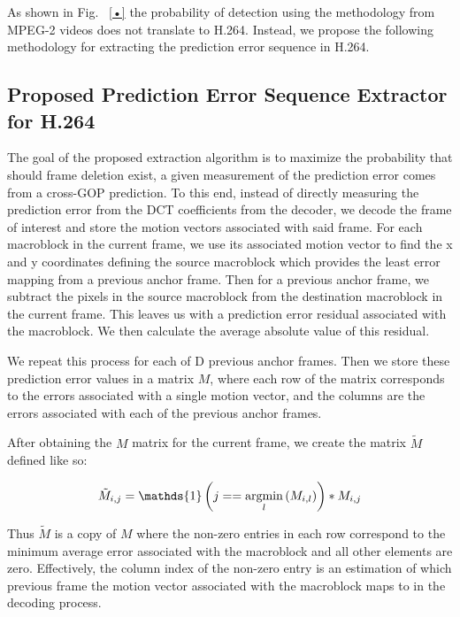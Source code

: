 
As shown in Fig. ~\ref{•} the probability of detection using the methodology from MPEG-2 videos does not translate to H.264. Instead, we propose the following methodology for extracting the prediction error sequence in H.264.

\subsection{Proposed Prediction Error Sequence Extractor for H.264}

The goal of the proposed extraction algorithm is to maximize the probability that should frame deletion exist, a given measurement of the prediction error comes from a cross-GOP prediction. To this end, instead of directly measuring the prediction error from the DCT coefficients from the decoder, we decode the frame of interest and store the motion vectors associated with said frame. For each macroblock in the current frame, we use its associated motion vector to find the x and y coordinates defining the source macroblock which provides the least error mapping from a previous anchor frame. Then for a previous anchor frame, we subtract the pixels in the source macroblock from the destination macroblock in the current frame. This leaves us with a prediction error residual associated with the macroblock. We then calculate the average absolute value of this residual.


We repeat this process for each of D previous anchor frames. Then we store these prediction error values in a matrix $M$, where each row of the matrix corresponds to the errors associated with a single motion vector, and the columns are the errors associated with each of the previous anchor frames.

After obtaining the $M$ matrix for the current frame, we create the matrix $\tilde{M}$ defined like so:

\begin{equation}
  \tilde{M}_{i, j} = \mathds{1} \left(j == \argmin_{l} \left( M_{i, l} \right) \right) * M_{i, j}
\end{equation}

Thus $\tilde{M}$ is a copy of $M$ where the non-zero entries in each row correspond to the minimum average error associated with the macroblock and all other elements are zero. Effectively, the column index of the non-zero entry is an estimation of which previous frame the motion vector associated with the macroblock maps to in the decoding process.

